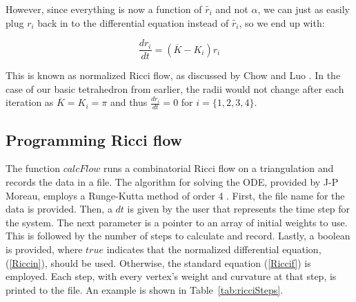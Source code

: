 \documentclass[12pt]{article}
\begin{document}
\noindent However, since everything is now a function of $\tilde{r_i}$ and not $\alpha$, we can just as easily plug $r_i$ back in to the differential equation instead of $\tilde{r_i}$, so we end up with:

\begin{equation}
\label{Riccin}
\frac{dr_i}{dt} = (\overline{K} - K_i)r_i
\end{equation}

\noindent This is known as normalized Ricci flow, as discussed by Chow and Luo \cite{chowluo}. In the case of our basic tetrahedron from earlier, the radii would not change after each iteration as $\overline{K} = K_i = \pi$ and thus $\displaystyle\frac{dr_i}{dt} = 0$ for $i = \{1,2,3,4\}$. 

\subsection{Programming Ricci flow}

\noindent The function $calcFlow$ runs a combinatorial Ricci flow on a triangulation and records the data in a file. The algorithm for solving the ODE, provided by J-P Moreau, employs a Runge-Kutta method of order 4 \cite{JPM}. First, the file name for the data is provided. Then, a $dt$ is given by the user that represents the time step for the system. The next parameter is a pointer to an array of initial weights to use. This is followed by the number of steps to calculate and record. Lastly, a boolean is provided, where $true$ indicates that the normalized differential equation, (\ref{Riccin}), should be used. Otherwise, the standard equation (\ref{Riccif}) is employed. Each step, with every vertex's weight and curvature at that step, is printed to the file. An example is shown in Table~\ref{tab:ricciSteps}.\newline
\end{document}
